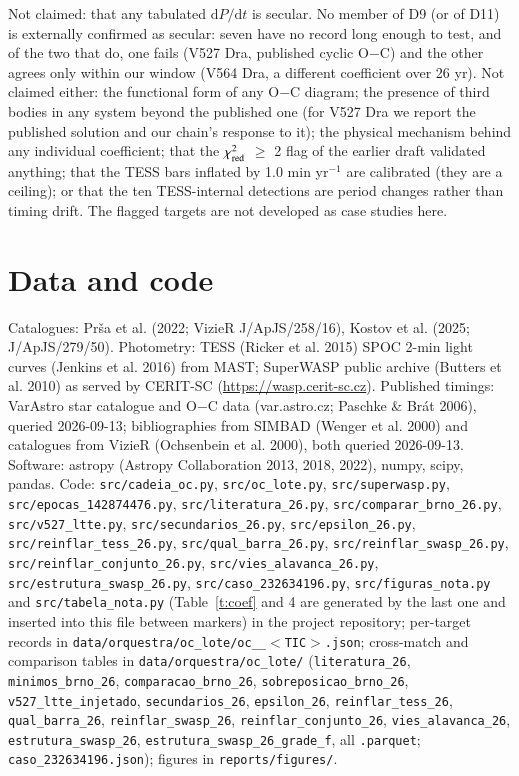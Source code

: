 \documentclass{aa}
\begin{document}
Not claimed: that any tabulated $\mathrm{d}P/\mathrm{d}t$ is secular. No member of D9 (or of D11) is externally confirmed as secular: seven have no record long enough to test, and of the two that do, one fails (V527 Dra, published cyclic O$-$C) and the other agrees only within our window (V564 Dra, a different coefficient over 26 yr). Not claimed either: the functional form of any O$-$C diagram; the presence of third bodies in any system beyond the published one (for V527 Dra we report the published solution and our chain's response to it); the physical mechanism behind any individual coefficient; that the $\chi^2_{\rm red}$ $\ge$ 2 flag of the earlier draft validated anything; that the TESS bars inflated by 1.0 min yr$^{-1}$ are calibrated (they are a ceiling); or that the ten TESS-internal detections are period changes rather than timing drift. The flagged targets are not developed as case studies here.

\section{Data and code}\label{s:data}
\begin{sloppypar}
Catalogues: Prša et al. (2022; VizieR J/ApJS/258/16), Kostov et al. (2025; J/ApJS/279/50). Photometry: TESS (Ricker et al. 2015) SPOC 2-min light curves (Jenkins et al. 2016) from MAST; SuperWASP public archive (Butters et al. 2010) as served by CERIT-SC (\url{https://wasp.cerit-sc.cz}). Published timings: VarAstro star catalogue and O$-$C data (var.astro.cz; Paschke \& Brát 2006), queried 2026-09-13; bibliographies from SIMBAD (Wenger et al. 2000) and catalogues from VizieR (Ochsenbein et al. 2000), both queried 2026-09-13. Software: astropy (Astropy Collaboration 2013, 2018, 2022), numpy, scipy, pandas. Code: \texttt{src/cadeia\_oc.py}, \texttt{src/oc\_lote.py}, \texttt{src/superwasp.py}, \texttt{src/epocas\_142874476.py}, \texttt{src/literatura\_26.py}, \texttt{src/comparar\_brno\_26.py}, \texttt{src/v527\_ltte.py}, \texttt{src/secundarios\_26.py}, \texttt{src/epsilon\_26.py}, \texttt{src/reinflar\_tess\_26.py}, \texttt{src/qual\_barra\_26.py}, \texttt{src/reinflar\_swasp\_26.py}, \texttt{src/reinflar\_conjunto\_26.py}, \texttt{src/vies\_alavanca\_26.py}, \texttt{src/\allowbreak estrutura\_swasp\_26.py}, \texttt{src/caso\_232634196.py}, \texttt{src/figuras\_nota.py} and \texttt{src/tabela\_nota.py} (Table~\ref{t:coef} and 4 are generated by the last one and inserted into this file between markers) in the project repository; per-target records in \texttt{data/orquestra/oc\_lote/oc\_\_$<$TIC$>$.json}; cross-match and comparison tables in \texttt{data/orquestra/oc\_lote/} (\texttt{literatura\_26}, \texttt{minimos\_brno\_26}, \texttt{comparacao\_brno\_26}, \texttt{sobreposicao\_brno\_26}, \texttt{v527\_ltte\_injetado}, \texttt{secundarios\_26}, \texttt{epsilon\_26}, \texttt{reinflar\_tess\_26}, \texttt{qual\_barra\_26}, \texttt{reinflar\_swasp\_26}, \texttt{reinflar\_conjunto\_26}, \texttt{vies\_alavanca\_26}, \texttt{estrutura\_swasp\_26}, \texttt{estrutura\_swasp\_26\_grade\_f}, all \texttt{.parquet}; \texttt{caso\_232634196.json}); figures in \texttt{reports/figures/}.
\end{sloppypar}
\end{document}
